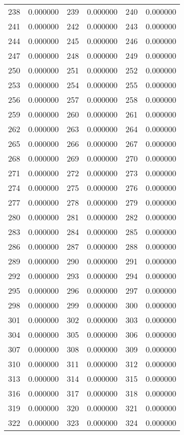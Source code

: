 \documentclass[12pt]{article}
\begin{document}
\begin{longtable}{@{}cc|cc|cc@{}}
238 & 0.000000 & 239 & 0.000000 & 240 & 0.000000 \\
241 & 0.000000 & 242 & 0.000000 & 243 & 0.000000 \\
244 & 0.000000 & 245 & 0.000000 & 246 & 0.000000 \\
247 & 0.000000 & 248 & 0.000000 & 249 & 0.000000 \\
250 & 0.000000 & 251 & 0.000000 & 252 & 0.000000 \\
253 & 0.000000 & 254 & 0.000000 & 255 & 0.000000 \\
256 & 0.000000 & 257 & 0.000000 & 258 & 0.000000 \\
259 & 0.000000 & 260 & 0.000000 & 261 & 0.000000 \\
262 & 0.000000 & 263 & 0.000000 & 264 & 0.000000 \\
265 & 0.000000 & 266 & 0.000000 & 267 & 0.000000 \\
268 & 0.000000 & 269 & 0.000000 & 270 & 0.000000 \\
271 & 0.000000 & 272 & 0.000000 & 273 & 0.000000 \\
274 & 0.000000 & 275 & 0.000000 & 276 & 0.000000 \\
277 & 0.000000 & 278 & 0.000000 & 279 & 0.000000 \\
280 & 0.000000 & 281 & 0.000000 & 282 & 0.000000 \\
283 & 0.000000 & 284 & 0.000000 & 285 & 0.000000 \\
286 & 0.000000 & 287 & 0.000000 & 288 & 0.000000 \\
289 & 0.000000 & 290 & 0.000000 & 291 & 0.000000 \\
292 & 0.000000 & 293 & 0.000000 & 294 & 0.000000 \\
295 & 0.000000 & 296 & 0.000000 & 297 & 0.000000 \\
298 & 0.000000 & 299 & 0.000000 & 300 & 0.000000 \\
301 & 0.000000 & 302 & 0.000000 & 303 & 0.000000 \\
304 & 0.000000 & 305 & 0.000000 & 306 & 0.000000 \\
307 & 0.000000 & 308 & 0.000000 & 309 & 0.000000 \\
310 & 0.000000 & 311 & 0.000000 & 312 & 0.000000 \\
313 & 0.000000 & 314 & 0.000000 & 315 & 0.000000 \\
316 & 0.000000 & 317 & 0.000000 & 318 & 0.000000 \\
319 & 0.000000 & 320 & 0.000000 & 321 & 0.000000 \\
322 & 0.000000 & 323 & 0.000000 & 324 & 0.000000 \\

\end{longtable}
\end{document}
